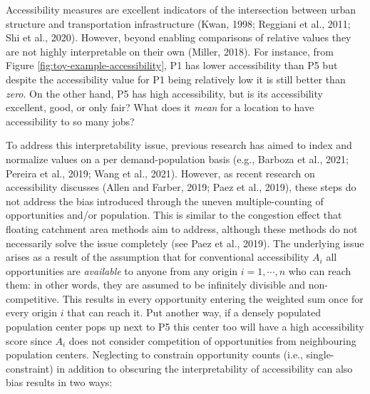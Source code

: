 \documentclass[]{elsarticle} %
\begin{document}
Accessibility measures are excellent indicators of the intersection
between urban structure and transportation infrastructure (Kwan, 1998;
Reggiani et al., 2011; Shi et al., 2020). However, beyond enabling
comparisons of relative values they are not highly interpretable on
their own (Miller, 2018). For instance, from Figure
\ref{fig:toy-example-accessibility}, P1 has lower accessibility than P5
but despite the accessibility value for P1 being relatively low it is
still better than \emph{zero}. On the other hand, P5 has high
accessibility, but is its accessibility excellent, good, or only fair?
What does it \emph{mean} for a location to have accessibility to so many
jobs?

To address this interpretability issue, previous research has aimed to
index and normalize values on a per demand-population basis (e.g.,
Barboza et al., 2021; Pereira et al., 2019; Wang et al., 2021). However,
as recent research on accessibility discusses (Allen and Farber, 2019;
Paez et al., 2019), these steps do not address the bias introduced
through the uneven multiple-counting of opportunities and/or population.
This is similar to the congestion effect that floating catchment area
methods aim to address, although these methods do not necessarily solve
the issue completely (see Paez et al., 2019). The underlying issue
arises as a result of the assumption that for conventional accessibility
\(A_i\) all opportunities are \emph{available} to anyone from any origin
\(i=1,\cdots,n\) who can reach them: in other words, they are assumed to
be infinitely divisible and non-competitive. This results in every
opportunity entering the weighted sum once for every origin \(i\) that
can reach it. Put another way, if a densely populated population center
pops up next to P5 this center too will have a high accessibility score
since \(A_i\) does not consider competition of opportunities from
neighbouring population centers. Neglecting to constrain opportunity
counts (i.e., single-constraint) in addition to obscuring the
interpretability of accessibility can also bias results in two ways:
\end{document}
